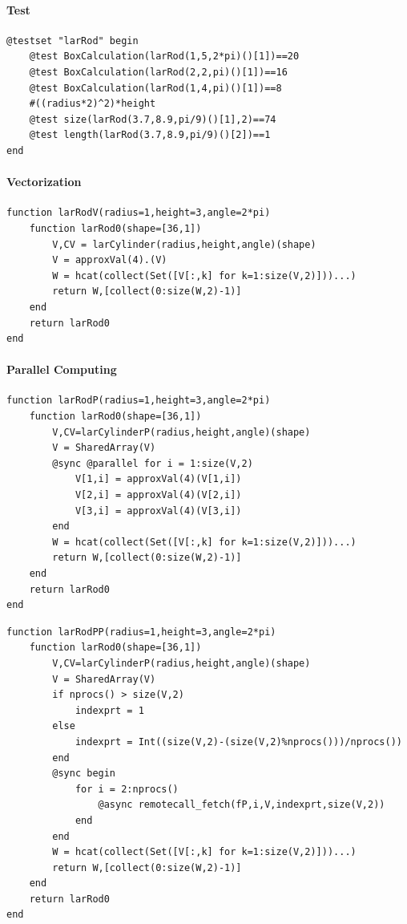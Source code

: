 \documentclass{article}
\begin{document}
\paragraph{Test}

\begin{Verbatim}
@testset "larRod" begin
	@test BoxCalculation(larRod(1,5,2*pi)()[1])==20
	@test BoxCalculation(larRod(2,2,pi)()[1])==16
	@test BoxCalculation(larRod(1,4,pi)()[1])==8
	#((radius*2)^2)*height
	@test size(larRod(3.7,8.9,pi/9)()[1],2)==74
	@test length(larRod(3.7,8.9,pi/9)()[2])==1
end
\end{Verbatim}

\paragraph{Vectorization\\}
\begin{Verbatim}
function larRodV(radius=1,height=3,angle=2*pi)
    function larRod0(shape=[36,1])
        V,CV = larCylinder(radius,height,angle)(shape)
        V = approxVal(4).(V)
        W = hcat(collect(Set([V[:,k] for k=1:size(V,2)]))...)
        return W,[collect(0:size(W,2)-1)]
    end
    return larRod0
end
\end{Verbatim}

\paragraph{Parallel Computing\\}

\begin{Verbatim}
function larRodP(radius=1,height=3,angle=2*pi)
    function larRod0(shape=[36,1])
        V,CV=larCylinderP(radius,height,angle)(shape)
        V = SharedArray(V)
        @sync @parallel for i = 1:size(V,2)
            V[1,i] = approxVal(4)(V[1,i])
            V[2,i] = approxVal(4)(V[2,i])
            V[3,i] = approxVal(4)(V[3,i])
        end
        W = hcat(collect(Set([V[:,k] for k=1:size(V,2)]))...)
        return W,[collect(0:size(W,2)-1)]
    end
    return larRod0
end
\end{Verbatim}

\begin{Verbatim}
function larRodPP(radius=1,height=3,angle=2*pi)
    function larRod0(shape=[36,1])
        V,CV=larCylinderP(radius,height,angle)(shape)
        V = SharedArray(V)
        if nprocs() > size(V,2)
            indexprt = 1
        else
            indexprt = Int((size(V,2)-(size(V,2)%nprocs()))/nprocs())
        end
        @sync begin
            for i = 2:nprocs()
                @async remotecall_fetch(fP,i,V,indexprt,size(V,2))
            end
        end
        W = hcat(collect(Set([V[:,k] for k=1:size(V,2)]))...)
        return W,[collect(0:size(W,2)-1)]
    end
    return larRod0
end
\end{Verbatim}
\end{document}
